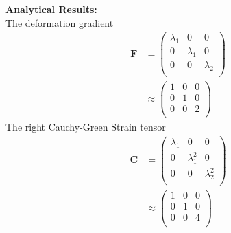 \documentclass[../main.tex]{subfiles}
\begin{document}
	\begin{minipage}[t]{0.5\textwidth}
          \textbf{Analytical Results:}\\
	
          The deformation gradient
          \begin{align*}
            \mathbf{F} &=
                         \begin{pmatrix}
                           \lambda_1 & 0  & 0\\
                           0 & \lambda_1 & 0\\
                           0  &  0  & \lambda_2\\
                         \end{pmatrix}\\ &\approx
                                           \begin{pmatrix}
                                             1 & 0 & 0\\
                                             0 & 1 & 0\\
                                             0 & 0 & 2\\
                                           \end{pmatrix}
          \end{align*}
          The right Cauchy-Green Strain tensor
          \begin{align*}
            \mathbf{C} &=
                         \begin{pmatrix}
                           \lambda_1 & 0 & 0\\
                           0 & \lambda_1^2 & 0\\
                           0 & 0 & \lambda_2^2\\
                         \end{pmatrix}\\ &\approx
                                           \begin{pmatrix}
                                             1 & 0 & 0\\
                                             0 & 1 & 0\\
                                             0 & 0 & 4\\
                                           \end{pmatrix}
          \end{align*}

\end{minipage}
\end{document}
